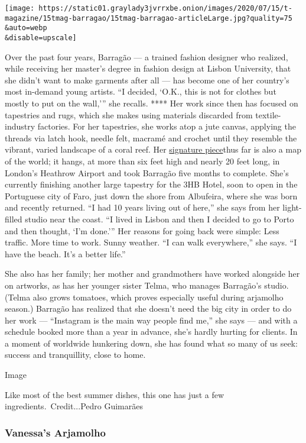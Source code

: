 \texttt{[image: https://static01.graylady3jvrrxbe.onion/images/2020/07/15/t-magazine/15tmag-barragao/15tmag-barragao-articleLarge.jpg?quality=75\\\&auto=webp\\\&disable=upscale]}

Over the past four years, Barragão --- a trained fashion designer who
realized, while receiving her master's degree in fashion design at
Lisbon University, that she didn't want to make garments after all ---
has become one of her country's most in-demand young artists. ``I
decided, `O.K., this is not for clothes but mostly to put on the
wall,''' she recalls. **** Her work since then has focused on tapestries
and rugs, which she makes using materials discarded from
textile-industry factories. For her tapestries, she works atop a jute
canvas, applying the threads via latch hook, needle felt, macramé and
crochet until they resemble the vibrant, varied landscape of a coral
reef. Her
\href{https://www.thisiscolossal.com/2019/07/vanessa-barragao-world-tapestry/}{signature
piece}thus far is also a map of the world; it hangs, at more than six
feet high and nearly 20 feet long, in London's Heathrow Airport and took
Barragão five months to complete. She's currently finishing another
large tapestry for the 3HB Hotel, soon to open in the Portuguese city of
Faro, just down the shore from Albufeira, where she was born and
recently returned. ``I had 10 years living out of here,'' she says from
her light-filled studio near the coast. ``I lived in Lisbon and then I
decided to go to Porto and then thought, `I'm done.''' Her reasons for
going back were simple: Less traffic. More time to work. Sunny weather.
``I can walk everywhere,'' she says. ``I have the beach. It's a better
life.''

She also has her family; her mother and grandmothers have worked
alongside her on artworks, as has her younger sister Telma, who manages
Barragão's studio. (Telma also grows tomatoes, which proves especially
useful during arjamolho season.) Barragão has realized that she doesn't
need the big city in order to do her work --- ``Instagram is the main
way people find me,'' she says --- and with a schedule booked more than
a year in advance, she's hardly hurting for clients. In a moment of
worldwide hunkering down, she has found what so many of us seek: success
and tranquillity, close to home.

Image

Like most of the best summer dishes, this one has just a few
ingredients.~Credit...Pedro Guimarães

\hypertarget{vanessas-arjamolho}{%
\subsubsection{Vanessa's Arjamolho}\label{vanessas-arjamolho}}

